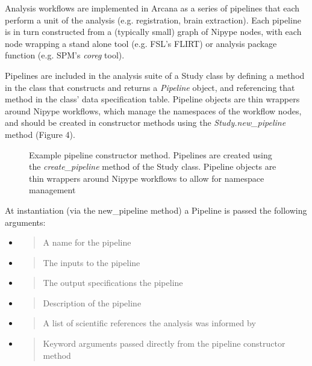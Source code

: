 Analysis workflows are implemented in Arcana as a series of pipelines
that each perform a unit of the analysis (e.g. registration, brain
extraction). Each pipeline is in turn constructed from a (typically
small) graph of Nipype nodes, with each node wrapping a stand alone tool
(e.g. FSL's FLIRT) or analysis package function (e.g. SPM's \emph{coreg}
tool).

Pipelines are included in the analysis suite of a Study class by
defining a method in the class that constructs and returns a
\emph{Pipeline} object, and referencing that method in the class' data
specification table. Pipeline objects are thin wrappers around Nipype
workflows, which manage the namespaces of the workflow nodes, and should
be created in constructor methods using the \emph{Study.new\_pipeline}
method (Figure 4).

\begin{figure}

\caption{Example pipeline constructor method. Pipelines are
created using the \emph{create\_pipeline} method of the Study class.
Pipeline objects are thin wrappers around Nipype workflows to allow for
namespace management}
\label{list:pipeline_constructor}
\end{figure}

At instantiation (via the new\_pipeline method) a Pipeline is passed the
following arguments:

\begin{itemize}
\item
  \begin{quote}
  A name for the pipeline
  \end{quote}
\item
  \begin{quote}
  The inputs to the pipeline
  \end{quote}
\item
  \begin{quote}
  The output specifications the pipeline
  \end{quote}
\item
  \begin{quote}
  Description of the pipeline
  \end{quote}
\item
  \begin{quote}
  A list of scientific references the analysis was informed by
  \end{quote}
\item
  \begin{quote}
  Keyword arguments passed directly from the pipeline constructor method
  \end{quote}
\end{itemize}

